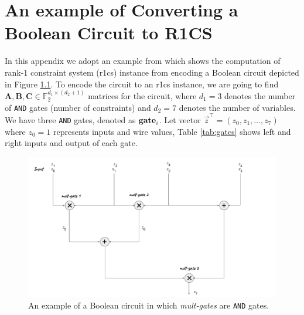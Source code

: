 \chapter{An example of Converting a Boolean Circuit to R1CS}\label{a_ch:r1cs_from_circuit}


In this appendix we adopt an example from \cite{Gong2024} which shows the computation of rank-1 constraint system (\gls{r1cs}) instance from encoding a Boolean circuit depicted in Figure \ref{fig:Arith-circuit}. To encode the circuit to an \gls{r1cs} instance, we are going to find $\mathbf{A}, \mathbf{B}, \mathbf{C} \in \mathbb{F}_2^{{d_1}\times{(d_2+1)}}$ matrices for the circuit, where $d_1 = 3$ denotes the number of  \texttt{AND} gates (number of constraints) and $d_2 = 7$ denotes the number of variables. We have three \texttt{AND} gates, denoted as $\text{\textbf{gate}}_i$. Let vector $\vec{z}^\intercal=(z_0, z_1, \ldots, z_7)$ where $z_0=1$ represents inputs and wire values, Table \ref{tab:gates} shows left and right inputs and output of each gate.

\begin{figure}[h]
	\centering
	\includegraphics[width=\textwidth]{Figures/Circuit.pdf}
	\caption[An arithmetic circuit example]{An example of a Boolean circuit in which \textit{mult-gates} are  \texttt{AND} gates.}
	\label{fig:Arith-circuit}
\end{figure}





